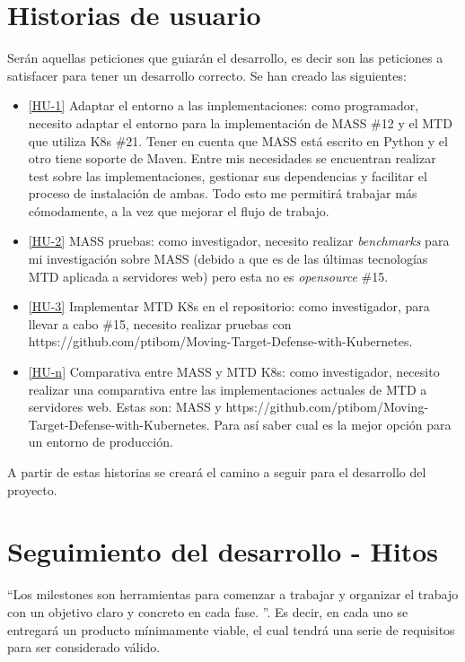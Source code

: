 \section{Historias de usuario}
Serán aquellas peticiones que guiarán el desarrollo, es decir son las peticiones a satisfacer para tener un desarrollo correcto. Se han creado las siguientes:
\begin{itemize}
    \item \href{https://github.com/marcosrmartin/MTD_Server/issues/16}{[HU-1]} Adaptar el entorno a las implementaciones: como programador, necesito adaptar el entorno para la implementación de MASS \#12 y el MTD que utiliza K8s \#21. Tener en cuenta que MASS está escrito en Python y el otro tiene soporte de Maven. Entre mis necesidades se encuentran realizar test sobre las implementaciones, gestionar sus dependencias y facilitar el proceso de instalación de ambas. Todo esto me permitirá trabajar más cómodamente, a la vez que mejorar el flujo de trabajo.
    \item \href{https://github.com/marcosrmartin/MTD_Server/issues/12}{[HU-2]} MASS pruebas: como investigador, necesito realizar \textit{benchmarks} para mi investigación sobre MASS (debido a que es de las últimas tecnologías MTD aplicada a servidores web) pero esta no es \textit{opensource} \#15.
    \item \href{https://github.com/marcosrmartin/MTD_Server/issues/21}{[HU-3]} Implementar MTD K8s en el repositorio: como investigador, para llevar a cabo \#15, necesito realizar pruebas con https://github.com/ptibom/Moving-Target-Defense-with-Kubernetes.
    \item \href{https://github.com/marcosrmartin/MTD_Server/issues/15}{[HU-n]} Comparativa entre MASS y MTD K8s: como investigador, necesito realizar una comparativa entre las implementaciones actuales de MTD a servidores web. Estas son: MASS y https://github.com/ptibom/Moving-Target-Defense-with-Kubernetes. Para así saber cual es la mejor opción para un entorno de producción.
\end{itemize}
A partir de estas historias se creará el camino a seguir para el desarrollo del proyecto.

\section{Seguimiento del desarrollo - Hitos}
``Los milestones son herramientas para comenzar a trabajar y organizar el trabajo con un objetivo claro y concreto en cada fase.
''\cite{iv}. Es decir, en cada uno se entregará un producto mínimamente viable, el cual tendrá una serie de requisitos para ser considerado válido.


